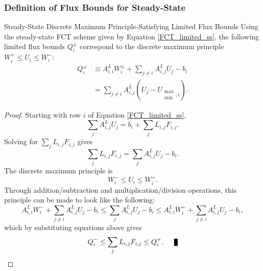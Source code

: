 \subsubsection{Definition of Flux Bounds for Steady-State}
\begin{theorem}{Steady-State Discrete Maximum Principle-Satisfying Limited
  Flux Bounds}{}
   Using the steady-state FCT scheme given by Equation \eqref{FCT_limited_ss},
   the following limited flux bounds $Q_i^\pm$ correspond to the discrete
   maximum principle $W_i^+\le U_i\le W_i^-$:
   \begin{equation}
   \begin{split}
      Q_i^\pm & \equiv A_{i,i}^L W_i^\pm + \sum\limits_{j\ne i} A_{i,j}^L U_j - b_i\\
      & = \sum\limits_{j\ne i}A_{i,j}^L(U_j - U_{\substack{\max\\\min},i}).
   \end{split}
   \end{equation}
\end{theorem}

\begin{proof}
   Starting with row $i$ of Equation \eqref{FCT_limited_ss},
   \[
      \sum\limits_j A_{i,j}^L U_j
      = b_i + \sum\limits_j L_{i,j}F_{i,j}.
   \]
   Solving for $\sum\limits_j L_{i,j}F_{i,j}$ gives
   \[
      \sum\limits_j L_{i,j}F_{i,j} =
      \sum\limits_j A_{i,j}^L U_j
      - b_i.
   \]
   The discrete maximum principle is
   \[
      W_i^-\le U_i\le W_i^+.
   \]
   Through addition/subtraction and multiplication/division operations, this
   principle can be made to look like the following:
   \[
   A_{i,i}^L W_i^- + \sum\limits_{j\ne i} A_{i,j}^L U_j - b_i
   \le \sum\limits_j A_{i,j}^L U_j - b_i
   \le A_{i,i}^L W_i^+ + \sum\limits_{j\ne i} A_{i,j}^L U_j - b_i,
   \]
   which by substituting equations above gives
   \[
      Q_i^-\le\sum\limits_j L_{i,j}F_{i,j}\le Q_i^+.\qed
   \]
\end{proof}
